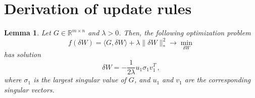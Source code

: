 \documentclass{article} %
\newtheorem{lemma}{Lemma}
\newcommand{\norm}[1]{\lVert #1\rVert}
\begin{document}
\section{Derivation of update rules}

\begin{lemma}\label{lem:opt_star}
Let $G \in \mathbb{R}^{m \times n}$ and $\lambda > 0$. Then, the following optimization problem
\begin{equation*} 
  f(\delta W) = \langle G, \delta W \rangle + \lambda \norm{\delta W}_*^2 \to \min_{\delta W}
\end{equation*}
has solution 
\begin{equation*}
  \delta W = -\frac{1}{2\lambda} u_1 \sigma_1 v_1^T\,,
\end{equation*}
where $\sigma_1$ is the largest singular value of $G$, and $u_1$ and $v_1$ are the corresponding singular vectors.
\end{lemma}
\end{document}
